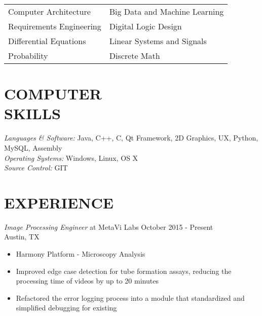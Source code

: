 \documentclass[line,margin]{res}
\begin{document}
\begin{resume}
\begin{tabularx}{\textwidth}{@{}XX@{}}
                  Computer Architecture & Big Data and Machine Learning\\

                  Requirements Engineering & Digital Logic Design \\

                  Differential Equations & Linear Systems and Signals \\

                  Probability & Discrete Math \\

                \end{tabularx}


                


                
 
\section{COMPUTER \\ SKILLS} {\sl Languages \& Software:} Java, C++, C, Qt Framework, 2D Graphics, UX, Python, MySQL, Assembly \\
        {\sl Operating Systems:} Windows, Linux, OS X \\
        {\sl Source Control:} GIT
 
        \section{EXPERIENCE} {\sl Image Processing Engineer} at MetaVi Labs \hfill October 2015 - Present \\
        Austin, TX 


        \begin{itemize}  \itemsep -2pt %
        \item         Harmony Platform - Microscopy Analysis
                \item Improved edge case detection for tube formation assays, reducing the processing time of videos by up to 20 minutes
                \item Refactored the error logging process into a module that standardized and simplified debugging for existing
                \end{itemize}
                

\end{resume}
\end{document}
